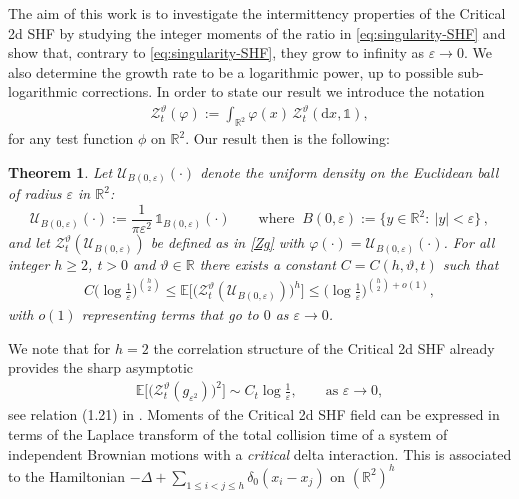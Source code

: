 \documentclass[a4paper,reqno,11pt]{amsart}
\numberwithin{equation}{section}
\theoremstyle{mytheorem}
\newtheorem{theorem}{Theorem}[section]
\newcommand{\bbE}{{\ensuremath{\mathbb E}} }
\newcommand{\cU}{{\ensuremath{\mathcal U}} }
\newcommand{\R}{\mathbb{R}}
\newcommand{\ind}{\mathds{1}}
\renewcommand{\epsilon}{\varepsilon}
\renewcommand{\theta}{\vartheta}
\newcommand\dd{\mathrm{d}}
\begin{document}
The aim of this work is to investigate the intermittency properties of the Critical 2d SHF  by studying the 
integer moments of the ratio in \eqref{eq:singularity-SHF} and show that, contrary to \eqref{eq:singularity-SHF},
 they grow to infinity as $\epsilon\to0$.
We also determine the growth rate to be a logarithmic power, up to possible sub-logarithmic corrections.
In order to state our result we introduce the notation
\begin{align}\label{Zg}
\mathscr{Z}^\theta_{t}(\varphi):=\int_{\R^2}  \varphi(x) \, \mathscr{Z}_t^\theta(\dd x, \ind),
\end{align}
for any test function $\phi$ on $\R^2$.
Our result then is the following:
\begin{theorem}\label{central}
Let $\cU_{B(0,\epsilon)}(\cdot)$ denote the uniform density on the Euclidean ball of radius $\epsilon$ in $\R^2$:
\begin{equation}\label{eq:uniform}
	\cU_{B(0,\epsilon)}(\cdot) := \frac{1}{\pi \epsilon^2} \, \ind_{B(0,\epsilon)}(\cdot) \qquad
	\text{where } \
	B(0,\epsilon) := \big\{y \in \R^2 \colon \ |y| < \epsilon \big\} \,,
\end{equation}
and let $\mathscr{Z}_{t}^\theta(\cU_{B(0,\epsilon)})$ be defined as in \eqref{Zg} with $\varphi (\cdot)=\cU_{B(0,\epsilon)}(\cdot)$.
For all integer $h\geq 2$, $t>0$ and $\theta\in \R$ there exists a constant $C=C(h,\theta,t)$ such that
\begin{align}\label{thm:mom}
C \big(\log \tfrac{1}{\epsilon}\big)^{h \choose 2} 
\le \bbE\Big[ \Big( \mathscr{Z}_{t}^\theta(\cU_{B(0,\epsilon)}) \Big)^h\Big] 
\le  \big(\log \tfrac{1}{\epsilon}\big)^{{h \choose 2} +o(1) },
\end{align}
with $o(1)$ representing terms that go to $0$ as $\epsilon\to0$.
\end{theorem}
We note that for $h=2$ the correlation structure of the Critical 2d SHF already provides
the sharp asymptotic 
\begin{align}\label{2mom-as}
\bbE\Big[ \Big(  \mathscr{Z}_{t}^\theta(g_{\epsilon^2}) \Big)^2\Big] \sim C_{t} \log\tfrac{1}{\epsilon}, 
\qquad \text{as $\epsilon\to0$},
\end{align}
see relation (1.21) in \cite{CSZ19b}.
\vskip 2mm
Moments of the Critical 2d SHF field can be expressed in terms of the Laplace transform of the total collision time 
of a system of independent Brownian motions with a {\it critical} delta interaction. This is associated to the Hamiltonian
$-\Delta+\sum_{1\leq i<j\leq h} \delta_0(x_i-x_j)$ on $(\R^2)^h$
\end{document}

